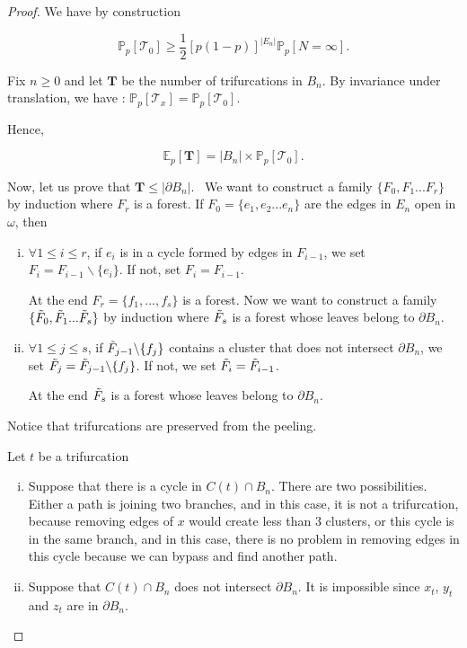 \documentclass[a4paper,11pt]{article}
\theoremstyle{plain}
\theoremstyle{definition}
\theoremstyle{remark}
\begin{document}
\begin{proof}
We have by construction

\[ \mathbb{P}_p[\mathscr{T}_0] \geq \frac{1}{2}[p (1 - p)]^{|E_n|}\mathbb{P}_p[N = \infty]. \]

Fix $n \geq 0$ and let $\mathbf{T}$ be the number of trifurcations in $B_n$.
By invariance under translation, we have : $\mathbb{P}_p[\mathscr{T}_x] = \mathbb{P}_p[\mathscr{T}_0]$.

Hence,

\[ \mathbb{E}_p[\mathbf{T}] = |B_n|\times\mathbb{P}_p[\mathscr{T}_0].\]

Now, let us prove that $\mathbf{T} \leq |\partial B_n|$. \ 
We want to construct a family $\{F_0, F_1 ... F_r\}$ by induction where $F_r$ is a forest.
If $F_0 = \{e_1, e_2... e_n\}$ are the edges in $E_n$ open in $\omega$, then

\begin{enumerate}[i)]
\item $\forall 1 \leq i \leq r$, if $e_i$ is in a cycle formed by edges in $F_{i - 1}$, we set $F_i = F_{i - 1} \backslash \{e_i\}$. If not, set $F_i = F_{i - 1}$.

At the end $F_r = \{f_1, ..., f_s\}$ is a forest.
Now we want to construct a family $\{ \Tilde{F}_0, \Tilde{F}_1 ... \Tilde{F}_s \}$ by induction where $\Tilde{F}_s$ is a forest whose leaves belong to $\partial B_n$.

\item $\forall 1 \leq j \leq s$, if $\Tilde{F}_{j - 1}\backslash \{f_j\}$ contains a cluster that does not intersect $\partial B_n$, we set $\Tilde{F}_j = \Tilde{F}_{j - 1} \backslash \{f_j\}$. If not, we set $\Tilde{F}_i = \Tilde{F}_{i - 1}$.

At the end $\Tilde{F}_{s}$ is a forest whose leaves belong to $\partial B_n$.
\end{enumerate}

Notice that trifurcations are preserved from the peeling.

Let $t$ be a trifurcation
\begin{enumerate}[i)]
\item Suppose that there is a cycle in $C(t) \cap B_n$. There are two possibilities. Either a path is joining two branches, and in this case, it is not a trifurcation, because removing edges of $x$ would create less than $3$ clusters, or this cycle is in the same branch, and in this case, there is no problem in removing edges in this cycle because we can bypass and find another path.

\item Suppose that $C(t) \cap B_n$ does not intersect $\partial B_n$. It is impossible since $x_t$, $y_t$ and $z_t$ are in $\partial B_n$.
\end{enumerate}


\end{proof}
\end{document}
